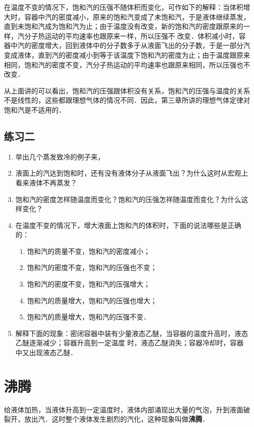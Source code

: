 在温度不变的情况下，饱和汽的压强不随体积而变化，可作如下的解释：当体积增大时，容器中汽的密度减小，原来的饱和汽变成了未饱和汽，于是液体继续蒸发，直到未饱和汽成为饱和汽为止；由于温度没有改变，新的饱和汽的密度跟原来的一样，汽分子热运动的平均速率也跟原来一样，所以压强不
改变．体积减小时，容器中汽的密度增大，回到液体中的分子数多于从液面飞出的分子数，于是一部分汽变成液体，直到汽的密度减小到等于该温度下饱和汽的密度为止；由于温度跟原来相同，饱和汽的密度不变，汽分子热运动的平均速率也跟原来相同，所以压强也不改变．

从上面讲的可以看出，饱和汽的压强跟体积没有关系，饱和汽的压强与温度的关系不是线性的，这些都跟理想气体的情况不同．因此，第三章所讲的理想气体定律对饱和汽是不适用的．


\subsection*{练习二}

\begin{enumerate}
    \item 举出几个蒸发致冷的例子来，
\item 液面上的汽达到饱和时，还有没有液体分子从液面飞出？为什么这时从宏观上看来液体不再蒸发？
\item 饱和汽的密度怎样随温度而变化？饱和汽的压强怎祥随温度而变化？为什么这样变化？
\item 在温度不变的情况下，增大液面上饱和汽的体积时，下面的说法哪些是正确的：
\begin{enumerate}
    \item 饱和汽的质量不变，饱和汽的密度减小；
    \item 饱和汽的密度不变，饱和汽的压强也不变；
    \item 饱和汽的密度不变，饱和汽的压强增大；
    \item 饱和汽的质量增大，饱和汽的压强也增大；
    \item 饱和汽的质量增大，饱和汽的压强不变．
\end{enumerate}

\item 解释下面的现象：密闭容器中装有少量液态乙醚，当容器的温度升高时，液态乙醚逐渐减少；容器升高到一定温度
时，液态乙醚消失；容器冷却时，容器中又出现液态乙醚．
\end{enumerate}

\section{沸腾}
给液体加热，当液体升高到一定温度时，液体内部涌现出大量的气泡，升到液面破裂开，放出汽．这时整个液体发生剧烈的汽化，这种现象叫做\textbf{沸腾}．

